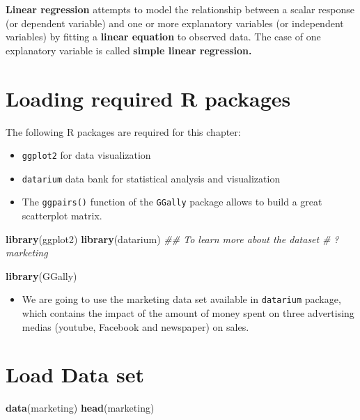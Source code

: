 \documentclass[]{book}
\newenvironment{Shaded}{\begin{snugshade}}{\end{snugshade}}
\newcommand{\CommentTok}[1]{\textcolor[rgb]{0.56,0.35,0.01}{\textit{#1}}}
\newcommand{\KeywordTok}[1]{\textcolor[rgb]{0.13,0.29,0.53}{\textbf{#1}}}
\newcommand{\NormalTok}[1]{#1}
\providecommand{\tightlist}{%
  \setlength{\itemsep}{0pt}\setlength{\parskip}{0pt}}
\begin{document}
\textbf{Linear regression} attempts to model the relationship between a scalar response (or dependent variable) and one or more explanatory variables (or independent variables) by fitting a \textbf{linear equation} to observed data. The case of one explanatory variable is called \textbf{simple linear regression.}

\hypertarget{loading-required-r-packages}{%
\section{Loading required R packages}\label{loading-required-r-packages}}

The following R packages are required for this chapter:

\begin{itemize}
\tightlist
\item
  \texttt{ggplot2} for data visualization
\item
  \texttt{datarium} data bank for statistical analysis and visualization
\item
  The \texttt{ggpairs()} function of the \texttt{GGally} package allows to build a great scatterplot matrix.
\end{itemize}

\begin{Shaded}
\begin{Highlighting}[]
\KeywordTok{library}\NormalTok{(ggplot2)}
\KeywordTok{library}\NormalTok{(datarium)}
\CommentTok{## To learn more about the dataset}
\CommentTok{# ?marketing}

\KeywordTok{library}\NormalTok{(GGally)}
\end{Highlighting}
\end{Shaded}

\begin{itemize}
\tightlist
\item
  We are going to use the marketing data set available in \texttt{datarium} package, which contains the impact of the amount of money spent on three advertising medias (youtube, Facebook and newspaper) on sales.
\end{itemize}

\hypertarget{load-data-set}{%
\section{Load Data set}\label{load-data-set}}

\begin{Shaded}
\begin{Highlighting}[]
\KeywordTok{data}\NormalTok{(marketing)}
\KeywordTok{head}\NormalTok{(marketing)}
\end{Highlighting}
\end{Shaded}
\end{document}
